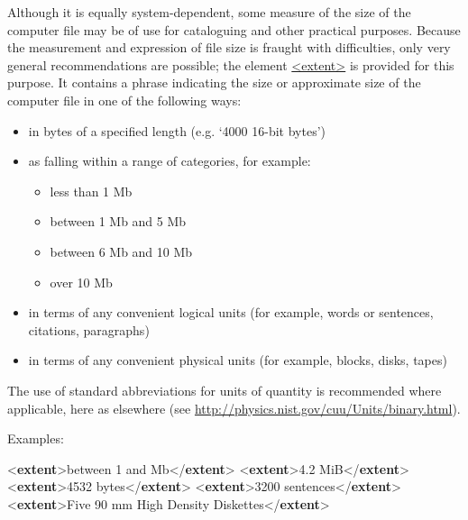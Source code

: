 Although it is equally system-dependent, some measure of the size of the computer file may be of use for cataloguing and other practical purposes. Because the measurement and expression of file size is fraught with difficulties, only very general recommendations are possible; the element \hyperref[TEI.extent]{<extent>} is provided for this purpose. It contains a phrase indicating the size or approximate size of the computer file in one of the following ways: \begin{itemize}
\item in bytes of a specified length (e.g. ‘4000 16-bit bytes’)
\item as falling within a range of categories, for example: \mbox{}\\[-10pt] \begin{itemize}
\item less than 1 Mb
\item between 1 Mb and 5 Mb
\item between 6 Mb and 10 Mb
\item over 10 Mb
\end{itemize} 
\item in terms of any convenient logical units (for example, words or sentences, citations, paragraphs)
\item in terms of any convenient physical units (for example, blocks, disks, tapes)
\end{itemize} \par
The use of standard abbreviations for units of quantity is recommended where applicable, here as elsewhere (see \url{http://physics.nist.gov/cuu/Units/binary.html}).\par
Examples: \par\bgroup{}\exampleFont \begin{shaded}\noindent\mbox{}{<\textbf{extent}>}between 1 and\mbox{} Mb{</\textbf{extent}>}\mbox{}\newline 
{<\textbf{extent}>}4.2 MiB{</\textbf{extent}>}\mbox{}\newline 
{<\textbf{extent}>}4532 bytes{</\textbf{extent}>}\mbox{}\newline 
{<\textbf{extent}>}3200 sentences{</\textbf{extent}>}\mbox{}\newline 
{<\textbf{extent}>}Five 90 mm High Density Diskettes{</\textbf{extent}>}\end{shaded}\egroup\par \par
